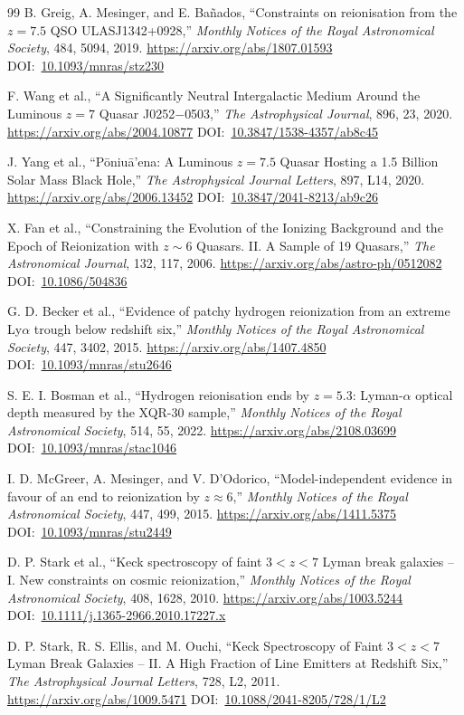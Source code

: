 \documentclass[10pt,onecolumn]{article}
\newcommand{\doi}[1]{DOI:~\href{https://doi.org/#1}{#1}}
\begin{document}
\begin{thebibliography}{99}
B. Greig, A. Mesinger, and E. Ba\~nados,
``Constraints on reionisation from the $z=7.5$ QSO ULASJ1342+0928,''
\emph{Monthly Notices of the Royal Astronomical Society}, 484, 5094, 2019.
\url{https://arxiv.org/abs/1807.01593}
\doi{10.1093/mnras/stz230}

F. Wang et al.,
``A Significantly Neutral Intergalactic Medium Around the Luminous $z=7$ Quasar J0252$-$0503,''
\emph{The Astrophysical Journal}, 896, 23, 2020.
\url{https://arxiv.org/abs/2004.10877}
\doi{10.3847/1538-4357/ab8c45}

J. Yang et al.,
``P\=oniu\=a'ena: A Luminous $z=7.5$ Quasar Hosting a 1.5 Billion Solar Mass Black Hole,''
\emph{The Astrophysical Journal Letters}, 897, L14, 2020.
\url{https://arxiv.org/abs/2006.13452}
\doi{10.3847/2041-8213/ab9c26}

X. Fan et al.,
``Constraining the Evolution of the Ionizing Background and the Epoch of Reionization with $z\sim6$ Quasars. II. A Sample of 19 Quasars,''
\emph{The Astronomical Journal}, 132, 117, 2006.
\url{https://arxiv.org/abs/astro-ph/0512082}
\doi{10.1086/504836}

G. D. Becker et al.,
``Evidence of patchy hydrogen reionization from an extreme Ly$\alpha$ trough below redshift six,''
\emph{Monthly Notices of the Royal Astronomical Society}, 447, 3402, 2015.
\url{https://arxiv.org/abs/1407.4850}
\doi{10.1093/mnras/stu2646}

S. E. I. Bosman et al.,
``Hydrogen reionisation ends by $z=5.3$: Lyman-$\alpha$ optical depth measured by the XQR-30 sample,''
\emph{Monthly Notices of the Royal Astronomical Society}, 514, 55, 2022.
\url{https://arxiv.org/abs/2108.03699}
\doi{10.1093/mnras/stac1046}

I. D. McGreer, A. Mesinger, and V. D'Odorico,
``Model-independent evidence in favour of an end to reionization by $z\approx6$,''
\emph{Monthly Notices of the Royal Astronomical Society}, 447, 499, 2015.
\url{https://arxiv.org/abs/1411.5375}
\doi{10.1093/mnras/stu2449}

D. P. Stark et al.,
``Keck spectroscopy of faint $3<z<7$ Lyman break galaxies -- I. New constraints on cosmic reionization,''
\emph{Monthly Notices of the Royal Astronomical Society}, 408, 1628, 2010.
\url{https://arxiv.org/abs/1003.5244}
\doi{10.1111/j.1365-2966.2010.17227.x}

D. P. Stark, R. S. Ellis, and M. Ouchi,
``Keck Spectroscopy of Faint $3<z<7$ Lyman Break Galaxies -- II. A High Fraction of Line Emitters at Redshift Six,''
\emph{The Astrophysical Journal Letters}, 728, L2, 2011.
\url{https://arxiv.org/abs/1009.5471}
\doi{10.1088/2041-8205/728/1/L2}


\end{thebibliography}
\end{document}
